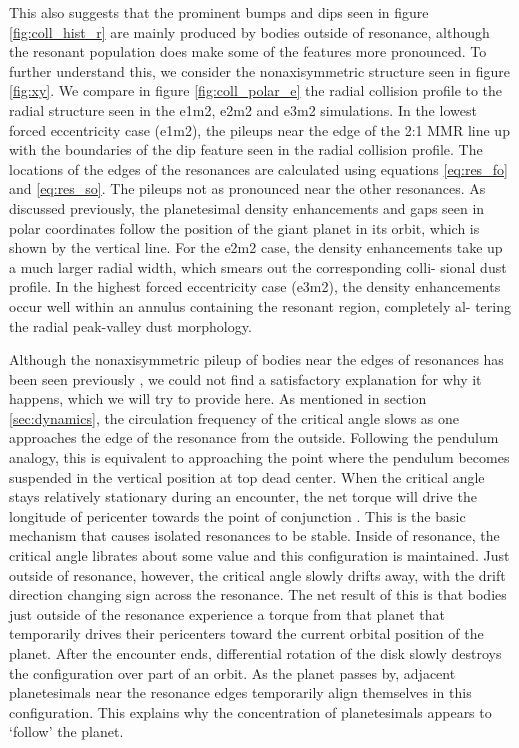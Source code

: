 \documentclass[twocolumn]{aastex63}
\begin{document}
This also suggests that the prominent bumps and dips seen in figure \ref{fig:coll_hist_r} are mainly produced by bodies outside of resonance, although 
the resonant population does make some of the features more pronounced. To further understand this, we consider the nonaxisymmetric structure 
seen in figure \ref{fig:xy}. We compare in figure \ref{fig:coll_polar_e} the radial collision profile to the radial structure seen in the e1m2, e2m2 and 
e3m2 simulations. In the lowest forced eccentricity case (e1m2), the pileups near the edge of the 2:1 MMR line up with the boundaries of the dip 
feature seen in the radial collision profile. The locations of the edges of the resonances are calculated using equations \ref{eq:res_fo} and 
\ref{eq:res_so}. The pileups not as pronounced near the other resonances. As discussed previously, the planetesimal density enhancements and gaps 
seen in polar coordinates follow the position of the giant planet in its orbit, which is shown by the vertical line. For the e2m2 case, the density 
enhancements take up a much larger radial width, which smears out the corresponding colli- sional dust profile. In the highest forced eccentricity case 
(e3m2), the density enhancements occur well within an annulus containing the resonant region, completely al- tering the radial peak-valley dust 
morphology.

Although the nonaxisymmetric pileup of bodies near the edges of resonances has been seen previously 
\citep{2000Icar..143...45R, 2016ApJ...818..159T}, we could not find a satisfactory explanation for why it happens, which we will try to provide here. As 
mentioned in section \ref{sec:dynamics}, the circulation frequency of the critical angle slows as one approaches the edge of the resonance from the 
outside. Following the pendulum analogy, this is equivalent to
approaching the point where the pendulum becomes suspended in the
vertical position at top dead center. 
When the critical angle stays relatively stationary during an encounter, the net torque will drive the longitude of pericenter towards the point of 
conjunction \citep{1976ARA&A..14..215P}.  This is the basic mechanism that causes isolated resonances to be stable. Inside of resonance, the critical 
angle librates about some value and this configuration is maintained. Just outside of resonance, however, the critical angle slowly drifts away, with the 
drift direction changing sign across the resonance. The net result of this is that bodies just outside of the resonance experience a torque from that 
planet that temporarily drives their pericenters toward the current orbital position of the planet. After the encounter ends, differential rotation of the disk 
slowly destroys the configuration over part of an orbit. As the planet passes by, adjacent planetesimals near the resonance edges temporarily align 
themselves in this configuration. This explains why the concentration of planetesimals appears to `follow' the planet.
\end{document}
